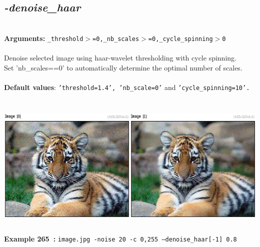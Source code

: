 \documentclass[a4paper,11pt,twoside]{book}
\begin{document}
\subsection{\emph{-denoise\_haar} }\vspace*{-0.5em}
~\\\textbf{Arguments: } 
{\small \texttt{\_threshold$>$=0,\_nb\_scales$>$=0,\_cycle\_spinning$>$0}}\\~\\
Denoise selected image using haar-wavelet thresholding with cycle spinning.
~\\Set 'nb\_scales==0' to automatically determine the optimal number of scales.
~\\~\\\textbf{Default values}: {\small \texttt{'threshold=1.4', 'nb\_scale=0'} and \texttt{'cycle\_spinning=10'.}}
\begin{center}\includegraphics[keepaspectratio=true,height=7cm,width=\textwidth]{img/gmic_def265.jpg}\\
{\footnotesize \textbf{Example 265~:} \texttt{image.jpg -noise 20 -c 0,255 --denoise\_haar[-1] 0.8}}
\end{center}
\end{document}
